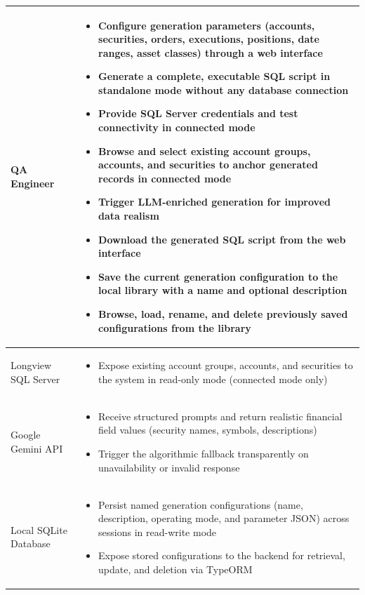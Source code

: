 \begin{longtable}{|P{3cm}|P{10cm}|}
QA Engineer
  & \begin{itemize}[noitemsep, topsep=2pt, leftmargin=*]
      \item Configure generation parameters (accounts, securities,
            orders, executions, positions, date ranges, asset classes)
            through a web interface
      \item Generate a complete, executable SQL script in standalone mode
            without any database connection
      \item Provide SQL Server credentials and test connectivity in
            connected mode
      \item Browse and select existing account groups, accounts, and
            securities to anchor generated records in connected mode
      \item Trigger LLM-enriched generation for improved data realism
      \item Download the generated SQL script from the web interface
      \item Save the current generation configuration to the local
            library with a name and optional description
      \item Browse, load, rename, and delete previously saved
            configurations from the library
    \end{itemize} \\
\hline
Longview SQL Server
  & \begin{itemize}[noitemsep, topsep=2pt, leftmargin=*]
      \item Expose existing account groups, accounts, and securities
            to the system in read-only mode (connected mode only)
    \end{itemize} \\
\hline
Google Gemini API
  & \begin{itemize}[noitemsep, topsep=2pt, leftmargin=*]
      \item Receive structured prompts and return realistic financial
            field values (security names, symbols, descriptions)
      \item Trigger the algorithmic fallback transparently on
            unavailability or invalid response
    \end{itemize} \\
\hline
Local SQLite Database
  & \begin{itemize}[noitemsep, topsep=2pt, leftmargin=*]
      \item Persist named generation configurations (name,
            description, operating mode, and parameter JSON)
            across sessions in read-write mode
      \item Expose stored configurations to the backend for
            retrieval, update, and deletion via TypeORM
    \end{itemize} \\
\hline
\end{longtable}


